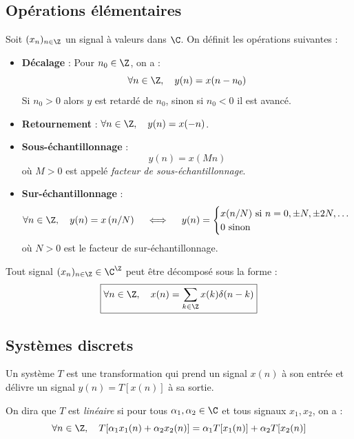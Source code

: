 \subsection{Opérations élémentaires}

\begin{definition}[Opérations]
    Soit $(x_n)_{n \in \Z}$ un signal à valeurs dans $\C$. On définit les opérations suivantes : 
    \begin{itemize} 
        \item \textbf{Décalage} : Pour $n_0 \in \Z$, on a : 
            $$ \forall n \in \Z, \quad y(n) = x(n - n_0) $$ 
        Si $n_0 > 0$ alors $y$ est retardé de $n_0$, sinon si $n_0 < 0$ il est avancé. 
        \item \textbf{Retournement} : $ \forall n \in \Z, \quad y(n) = x(-n) $. 
        \item \textbf{Sous-échantillonnage} : 
            $$ y(n) = x(M n) $$
        où $M > 0$ est appelé \emph{facteur de sous-échantillonnage}. 
        \item \textbf{Sur-échantillonnage} :
            $$ \forall n \in \Z, \quad 
                y(n) = x \left(n / N\right) 
                \quad \iff \quad 
                y(n) = 
                \begin{cases}
                    x(n/N) \text{ si } n = 0, \pm N, \pm 2N, \dots \\ 
                    0 \text{ sinon }  
                \end{cases}
            $$
            où $N > 0$ est le facteur de sur-échantillonnage.
    \end{itemize}
\end{definition}

\begin{theorem}[Décomposition]
    Tout signal $(x_n)_{n \in \Z} \in \C^\Z$ peut être décomposé sous la forme : 
        \begin{equation}
            \boxed{\forall n \in \Z, \quad x(n) = \sum_{k \in \Z} x(k) \delta(n - k)}
        \end{equation}
\end{theorem}

\subsection{Systèmes discrets}

\begin{definition}[Système]
    Un système $T$ est une transformation qui prend un signal $x(n)$ à son entrée et délivre un signal $y(n) = T[x(n)]$ à sa sortie. 

    On dira que $T$ est \emph{linéaire} si pour tous $\alpha_1, \alpha_2 \in \C$ et tous signaux $x_1, x_2$, on a :
        \begin{equation}
            \forall n \in \Z, \quad T[ \alpha_1 x_1(n) + \alpha_2 x_2(n)] = \alpha_1 T[x_1(n)] + \alpha_2 T[x_2(n)] 
        \end{equation}
\end{definition}

